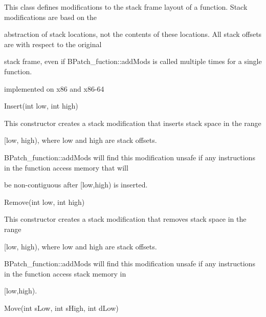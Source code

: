 \label{bkm:Ref419102257}{

This class defines modifications to the stack frame layout of a function. Stack modifications are basd on the

abstraction of stack locations, not the contents of these locations. All stack offsets are with respect to the original

stack frame, even if BPatch_fuction::addMods is called multiple times for a single function.



{

implemented on x86 and x86-64}





\bigskip



{

Insert(int low, int high)}



{

This constructor creates a stack modification that inserts stack space in the range \newline

[low, high), where low and high are stack offsets.}



{

BPatch_function::addMods will find this modification unsafe if any instructions in the function access memory that will

be non-contiguous after [low,high) is inserted.}



{

Remove(int low, int high)}



{

This constructor creates a stack modification that removes stack space in the range \newline

[low, high), where low and high are stack offsets.}



{

BPatch_function::addMods will find this modification unsafe if any instructions in the function access stack memory in

[low,high).}



{

Move(int sLow, int sHigh, int dLow)}



}
